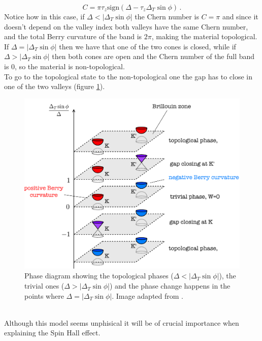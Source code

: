     \begin{equation}
        C=\pi\tau_z\textrm{sign}(\Delta - \tau_z\Delta_T\sin\phi)\,.
    \end{equation}
    Notice how in this case, if $\Delta<|\Delta_T\sin\phi|$ the Chern number is $C=\pi$ and since it doesn't depend on the valley index both valleys have the same Chern number, and the total Berry curvature of the band is $2\pi$, making the material topological.\\
    If $\Delta = |\Delta_T\sin\phi|$ then we have that one of the two cones is closed, while if $\Delta>|\Delta_T\sin\phi|$ then both cones are open and the Chern number of the full band is 0, so the material is non-topological.\\
    To go to the topological state to the non-topological one the gap has to close in one of the two valleys (figure \ref{fig:gaps-topo-haldane}).
    \begin{figure}[h]
        \centering
        \includegraphics[width=\textwidth]{Immagini/ValleyHall/phasediagram-haldane.pdf}
        \caption{Phase diagram showing the topological phases ($\Delta<|\Delta_T\sin\phi|$), the trivial ones ($\Delta>|\Delta_T\sin\phi|$) and the phase change happens in the points where $\Delta = |\Delta_T\sin\phi|$. Image adapted from \cite{topocondmat}.}
        \label{fig:gaps-topo-haldane}
    \end{figure}\\
    Although this model seems unphisical it will be of crucial importance when explaining the Spin Hall effect.%